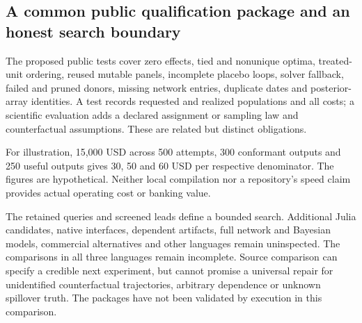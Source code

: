 \subsection{A common public qualification package and an honest search boundary}
The proposed public tests cover zero effects, tied and nonunique optima,
treated-unit ordering, reused mutable panels, incomplete placebo loops,
solver fallback, failed and pruned donors, missing network entries,
duplicate dates and posterior-array identities. A test records requested
and realized populations and all costs; a scientific evaluation adds a
declared assignment or sampling law and counterfactual assumptions.
These are related but distinct obligations.\citep{exec25_synthcross_choice}

For illustration, 15,000 USD across 500 attempts, 300 conformant outputs
and 250 useful outputs gives 30, 50 and 60 USD per respective denominator.
The figures are hypothetical. Neither local compilation nor a repository's
speed claim provides actual operating cost or banking value.
\citep{exec25_synthcross_choice}

The retained queries and screened leads define a bounded search. Additional
Julia candidates, native interfaces, dependent artifacts, full network and
Bayesian models, commercial alternatives and other languages remain
uninspected. The comparisons in all three languages remain incomplete. Source comparison
can specify a credible next experiment, but cannot promise a universal
repair for unidentified counterfactual trajectories, arbitrary dependence
or unknown spillover truth. The packages have not been validated by execution in this comparison.
\citep{exec25_synthcross_choice}
